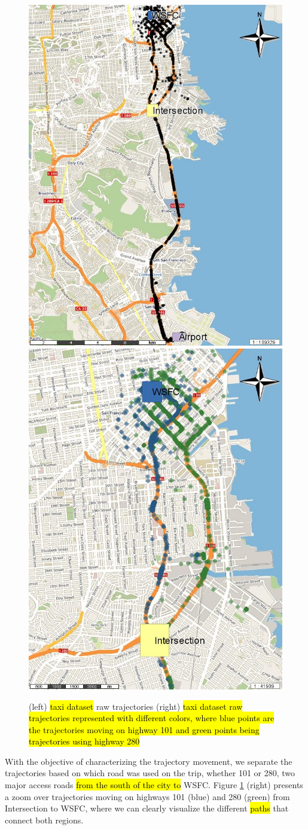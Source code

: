 \documentclass[12pt]{article}
\begin{document}
\begin{figure}[ht!]
\centering
\includegraphics[width=.49\textwidth]{Images/CRAWDAD-Trajectories-Painted}
\includegraphics[width=.49\textwidth]{Images/CRAWDAD-Paths-Painted}
\caption{(left) \hl{taxi dataset} raw trajectories (right) \hl{taxi dataset raw trajectories represented with different colors, where blue points are the trajectories moving on highway 101 and green points being trajectories using highway 280}}
\label{fig:sanfrancisco_map_rois}
\end{figure}

With the objective of characterizing the trajectory movement, we separate the trajectories based on which road was used on the trip, whether 101 or 280, two major access roads \hl{from the south of the city to} WSFC. {Figure \ref{fig:sanfrancisco_map_rois}} (right) presents a zoom over trajectories moving on highways 101 (blue) and 280 (green) from Intersection to WSFC, where we can clearly visualize the different \hl{paths} that connect both regions.
\end{document}
